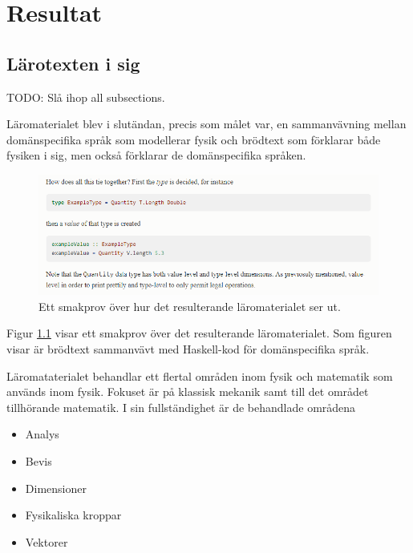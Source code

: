 
\chapter{Resultat}

\begin{binge}

\section{Lärotexten i sig}

TODO: Slå ihop all subsections.

Läromaterialet blev i slutändan, precis som målet var, en sammanvävning mellan
domänspecifika språk som modellerar fysik och brödtext som förklarar både
fysiken i sig, men också förklarar de domänspecifika språken.

\begin{figure}
  \includegraphics[width=\linewidth]{figure/smakprov_laromaterial.png}
  \caption{Ett smakprov över hur det resulterande läromaterialet ser ut.}
  \label{fig:smakprov_laromaterial}
\end{figure}

Figur \ref{fig:smakprov_laromaterial} visar ett smakprov över det resulterande
läromaterialet. Som figuren visar är brödtext sammanvävt med Haskell-kod för
domänspecifika språk.

Läromataterialet behandlar ett flertal områden inom fysik och matematik som
används inom fysik. Fokuset är på klassisk mekanik samt till det området tillhörande
matematik. I sin fullständighet är de behandlade områdena

\begin{itemize}
  \item Analys
  \item Bevis
  \item Dimensioner
  \item Fysikaliska kroppar
  \item Vektorer
\end{itemize}


\end{binge}
